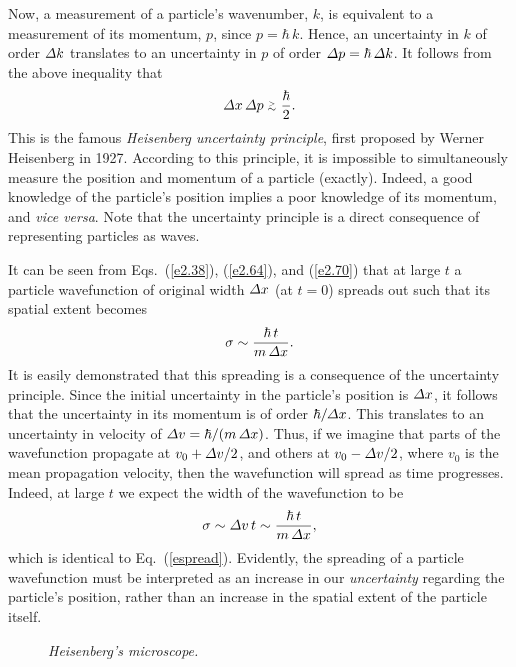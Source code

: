 Now, a measurement of a particle's wavenumber, $k$, is equivalent to
a measurement of its momentum, $p$, since $p=\hbar \,k$. Hence,
an uncertainty in $k$ of order ${\mit\Delta} k$ translates to
an uncertainty in $p$ of order ${\mit\Delta}p=\hbar\,{\mit\Delta}k$.
It follows from the above inequality that
\begin{equation}
{\mit\Delta}x\,{\mit\Delta} p \gtapp \frac{\hbar}{2}. 
\end{equation}
This is the famous {\em Heisenberg uncertainty principle},
first proposed by Werner Heisenberg in 1927.
According to this principle, it is impossible to simultaneously
measure the position and momentum of a particle (exactly). Indeed, a good knowledge
of the particle's position implies a poor knowledge of its momentum,
and {\em vice versa}. Note that the uncertainty principle is a direct consequence of representing particles as waves.

It can be seen from Eqs.~(\ref{e2.38}), (\ref{e2.64}), and (\ref{e2.70})
that at large $t$ a particle wavefunction of original width ${\mit\Delta} x$
(at $t=0$) spreads out such that its spatial extent becomes
\begin{equation}\label{espread}
\sigma\sim \frac{\hbar\,t}{m\,{\mit\Delta}x}.
\end{equation}
It is easily demonstrated that this spreading is a consequence of the
uncertainty principle. Since the initial uncertainty in the particle's
position is ${\mit\Delta}x$, it follows that the uncertainty in its
momentum is of order $\hbar/{\mit\Delta}x$. This translates to an uncertainty
in velocity of ${\mit\Delta}v = \hbar/(m\,{\mit\Delta}x)$. Thus,
if we imagine that parts of the wavefunction propagate at $v_0+ {\mit\Delta}v/2$, and others at $v_0-{\mit\Delta}v/2$, where $v_0$ is
the mean propagation velocity, then the wavefunction will
 spread as time progresses. Indeed, at large $t$ we expect the
width of the wavefunction to be
\begin{equation}
\sigma \sim {\mit\Delta}v\,t \sim  \frac{\hbar\,t}{m\,{\mit\Delta}x},
\end{equation}
which is identical to Eq.~(\ref{espread}). Evidently, the spreading of
a particle wavefunction must be interpreted as an increase
in our {\em uncertainty}\/ regarding the particle's position, rather than
an increase in the spatial extent of the particle itself.

\begin{figure}
\centerline{}
\caption{\em Heisenberg's microscope.}\label{fh}   
\end{figure}

